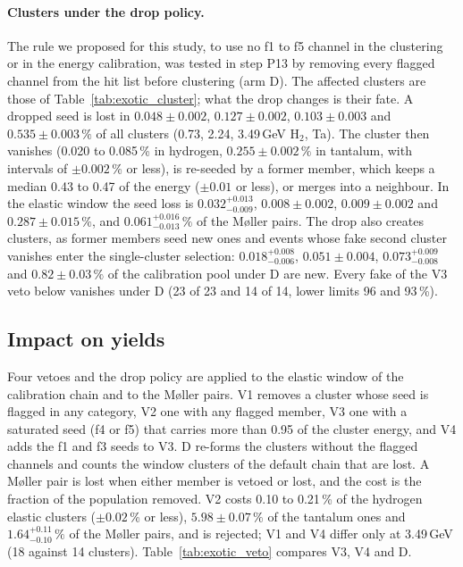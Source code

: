 \documentclass[11pt]{article}
\begin{document}
\paragraph{Clusters under the drop policy.} The rule we proposed for this study, to use no f1 to f5 channel in the clustering or in the energy calibration, was tested in step P13 by removing every flagged channel from the hit list before clustering (arm D). The affected clusters are those of Table~\ref{tab:exotic_cluster}; what the drop changes is their fate. A dropped seed is lost in $0.048 \pm 0.002$, $0.127 \pm 0.002$, $0.103 \pm 0.003$ and $0.535 \pm 0.003\,\%$ of all clusters (0.73, 2.24, 3.49\,GeV H$_2$, Ta). The cluster then vanishes (0.020 to 0.085\,\% in hydrogen, $0.255 \pm 0.002\,\%$ in tantalum, with intervals of $\pm 0.002$\,\% or less), is re-seeded by a former member, which keeps a median 0.43 to 0.47 of the energy ($\pm 0.01$ or less), or merges into a neighbour. In the elastic window the seed loss is $0.032^{+0.013}_{-0.009}$, $0.008 \pm 0.002$, $0.009 \pm 0.002$ and $0.287 \pm 0.015\,\%$, and $0.061^{+0.016}_{-0.013}\,\%$ of the M\o ller pairs. The drop also creates clusters, as former members seed new ones and events whose fake second cluster vanishes enter the single-cluster selection: $0.018^{+0.008}_{-0.006}$, $0.051 \pm 0.004$, $0.073^{+0.009}_{-0.008}$ and $0.82 \pm 0.03\,\%$ of the calibration pool under D are new. Every fake of the V3 veto below vanishes under D (23 of 23 and 14 of 14, lower limits 96 and 93\,\%).

\subsection{Impact on yields}
\label{sec:exotic_yields}

Four vetoes and the drop policy are applied to the elastic window of the calibration chain and to the M\o ller pairs. V1 removes a cluster whose seed is flagged in any category, V2 one with any flagged member, V3 one with a saturated seed (f4 or f5) that carries more than 0.95 of the cluster energy, and V4 adds the f1 and f3 seeds to V3. D re-forms the clusters without the flagged channels and counts the window clusters of the default chain that are lost. A M\o ller pair is lost when either member is vetoed or lost, and the cost is the fraction of the population removed. V2 costs 0.10 to 0.21\,\% of the hydrogen elastic clusters ($\pm 0.02$\,\% or less), $5.98 \pm 0.07\,\%$ of the tantalum ones and $1.64^{+0.11}_{-0.10}\,\%$ of the M\o ller pairs, and is rejected; V1 and V4 differ only at 3.49\,GeV (18 against 14 clusters). Table~\ref{tab:exotic_veto} compares V3, V4 and D.
\end{document}
